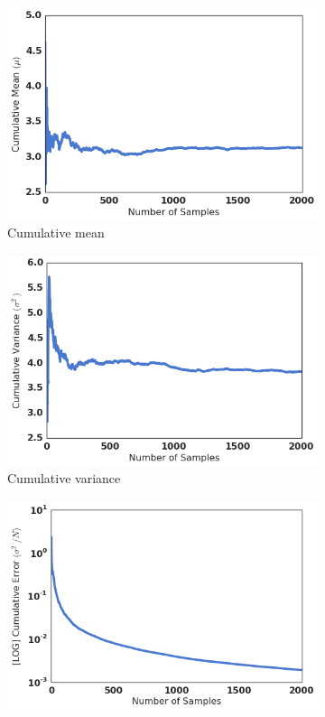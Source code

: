 \documentclass[12pt]{article}
\begin{document}
\begin{figure}[H]
    \centering
    \begin{subfigure}[b]{.49\textwidth}
        \includegraphics[width=\textwidth]{fig/1mu.png}
        \caption{Cumulative mean}
        \label{fig:1:mu}
    \end{subfigure}
    \begin{subfigure}[b]{.49\textwidth}
        \includegraphics[width=\textwidth]{fig/1var.png}
        \caption{Cumulative variance}
        \label{fig:1:var}
    \end{subfigure}
    \begin{subfigure}[b]{.49\textwidth}
        \includegraphics[width=\textwidth]{fig/1err.png}

\end{subfigure}
\end{figure}
\end{document}
